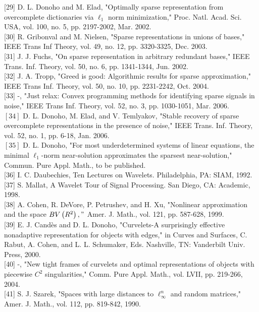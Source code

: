 \documentclass[10pt]{article}
\begin{document}
[29] D. L. Donoho and M. Elad, "Optimally sparse representation from overcomplete dictionaries via $\ell_{1}$ norm minimization," Proc. Natl. Acad. Sci. USA, vol. 100, no. 5, pp. 2197-2002, Mar. 2002.\\[0pt]
[30] R. Gribonval and M. Nielsen, "Sparse representations in unions of bases," IEEE Trans Inf Theory, vol. 49, no. 12, pp. 3320-3325, Dec. 2003.\\[0pt]
[31] J. J. Fuchs, "On sparse representation in arbitrary redundant bases," IEEE Trans. Inf. Theory, vol. 50, no. 6, pp. 1341-1344, Jun. 2002.\\[0pt]
[32] J. A. Tropp, "Greed is good: Algorithmic results for sparse approximation," IEEE Trans Inf. Theory, vol. 50, no. 10, pp. 2231-2242, Oct. 2004.\\[0pt]
[33] -, "Just relax: Convex programming methods for identifying sparse signals in noise," IEEE Trans Inf. Theory, vol. 52, no. 3, pp. 1030-1051, Mar. 2006.\\
$[34]$ D. L. Donoho, M. Elad, and V. Temlyakov, "Stable recovery of sparse overcomplete representations in the presence of noise," IEEE Trans. Inf. Theory, vol. 52, no. 1, pp. 6-18, Jan. 2006.\\
$[35]$ D. L. Donoho, "For most underdetermined systems of linear equations, the minimal $\ell_{1}$-norm near-solution approximates the sparsest near-solution," Commun. Pure Appl. Math., to be published.\\[0pt]
[36] I. C. Daubechies, Ten Lectures on Wavelets. Philadelphia, PA: SIAM, 1992.\\[0pt]
[37] S. Mallat, A Wavelet Tour of Signal Processing. San Diego, CA: Academic, 1998.\\[0pt]
[38] A. Cohen, R. DeVore, P. Petrushev, and H. Xu, "Nonlinear approximation and the space $B V\left(R^{2}\right), "$ Amer. J. Math., vol. 121, pp. 587-628, 1999.\\[0pt]
[39] E. J. Candès and D. L. Donoho, "Curvelets-A surprisingly effective nonadaptive representation for objects with edges," in Curves and Surfaces, C. Rabut, A. Cohen, and L. L. Schumaker, Eds. Nashville, TN: Vanderbilt Univ. Press, 2000.\\[0pt]
[40] -, "New tight frames of curvelets and optimal representations of objects with piecewise $C^{2}$ singularities," Comm. Pure Appl. Math., vol. LVII, pp. 219-266, 2004.\\[0pt]
[41] S. J. Szarek, "Spaces with large distances to $\ell_{\infty}^{n}$ and random matrices," Amer. J. Math., vol. 112, pp. 819-842, 1990.\\[0pt]
\end{document}
